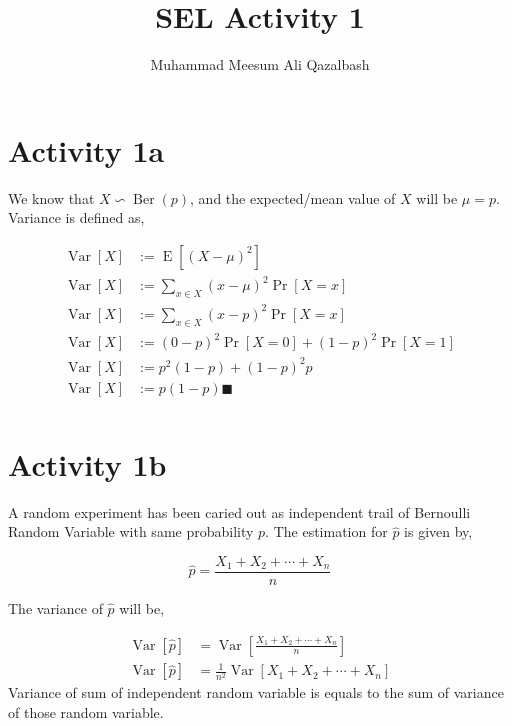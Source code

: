 \documentclass{article}
\title{SEL Activity 1}
\author{Muhammad Meesum Ali Qazalbash}
\theoremstyle{mytheoremstyle}
\theoremstyle{mytheoremstyle}
\theoremstyle{myproblemstyle}
\begin{document}
\maketitle

\section{Activity 1a}
We know that \(X\backsim \operatorname{Ber}(p)\), and the expected/mean value of \(X\) will be \(\mu=p\). Variance is defined as,

\begin{equation}
    \begin{split}
        \operatorname{Var}[X]&:=\operatorname{E}[(X-\mu)^2]\\
        \operatorname{Var}[X]&:=\sum_{x\in X}(x-\mu)^2\operatorname{Pr}[X=x]\\
        \operatorname{Var}[X]&:=\sum_{x\in X}(x-p)^2\operatorname{Pr}[X=x]\\
        \operatorname{Var}[X]&:=(0-p)^2\operatorname{Pr}[X=0]+(1-p)^2\operatorname{Pr}[X=1]\\
        \operatorname{Var}[X]&:=p^2(1-p)+(1-p)^2p\\
        \operatorname{Var}[X]&:=p(1-p)\blacksquare\\
    \end{split}
\end{equation}

\section{Activity 1b}

A random experiment has been caried out as independent trail of Bernoulli Random Variable with same probability \(p\). The estimation for \(\hat{p}\) is given by,

\[\hat{p}=\frac{X_1+X_2+\cdots+X_n}{n}\]

The variance of \(\hat{p}\) will be,

\begin{equation}
    \begin{split}
        \operatorname{Var}[\hat{p}]&=\operatorname{Var}\left[\frac{X_1+X_2+\cdots+X_n}{n}\right]\\
        \operatorname{Var}[\hat{p}]&=\frac{1}{n^2}\operatorname{Var}\left[X_1+X_2+\cdots+X_n\right]
    \end{split}
\end{equation}
Variance of sum of independent random variable is equals to the sum of variance of those random variable.
\end{document}
